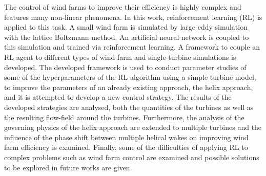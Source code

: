 The control of wind farms to improve their efficiency is highly complex and features many non-linear phenomena. In this work, reinforcement learning (RL) is applied to this task. A small wind farm is simulated by large eddy simulation with the lattice Boltzmann method. An artificial neural network is coupled to this simulation and trained via reinforcement learning. A framework to couple an RL agent to different types of wind farm  and single-turbine simulations is developed. The developed framework is used to conduct parameter studies of some of the hyperparameters of the RL algorithm using a simple turbine model, to improve the parameters of an already existing approach, the helix approach, and it is attempted to develop a new control strategy. The results of the developed strategies are analysed, both the quantities of the turbines as well as the resulting flow-field around the turbines. Furthermore, the analysis of the governing physics of the helix approach are extended to multiple turbines and the influence of the phase shift between multiple helical wakes on improving wind farm efficiency is examined. Finally, some of the difficulties of applying RL to complex problems such as wind farm control are examined and possible solutions to be explored in future works are given.
